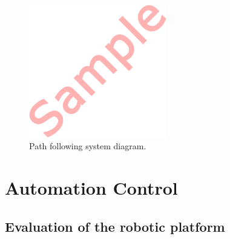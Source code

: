 \begin{figure}[H]
	\centering
  	\includegraphics[width=6cm]{include/images/dummy.PNG}
  	\caption{Path following system diagram.}
  	\label{fig:path_following_diagram}
\end{figure}

\section{Automation Control}

\subsection{Evaluation of the robotic platform}
